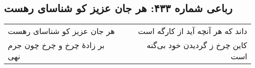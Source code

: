 \begin{center}
\section*{رباعی شماره ۴۳۳: هر جان عزیز کو شناسای رهست}
\label{sec:0433}
\begin{longtable}{l p{0.5cm} r}
هر جان عزیز کو شناسای رهست
&&
داند که هر آنچه آید از کارگه است
\\
بر زادهٔ چرخ و چرخ چون جرم نهی
&&
کاین چرخ ز گردیدن خود بی‌گنه است
\\
\end{longtable}
\end{center}
